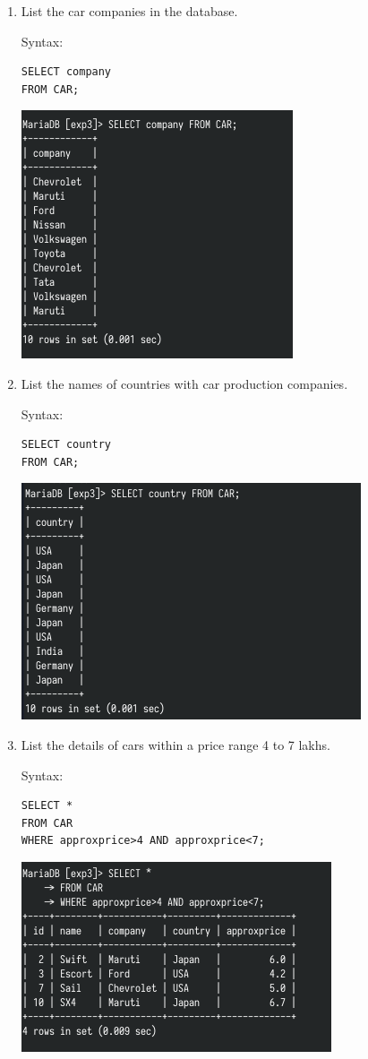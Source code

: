 \documentclass[13pt,oneside]{book}
\begin{document}
\begin{enumerate}
\item
List the car companies in the database.
 
Syntax:
\begin{verbatim}
SELECT company 
FROM CAR;

\end{verbatim}
\includegraphics[]{img/p3/ss2.png}


\item
List the names of countries with car production companies.
 
Syntax:
\begin{verbatim}
SELECT country 
FROM CAR;

\end{verbatim}
\includegraphics[]{img/p3/ss3.png}


\item
List the details of cars within a price range 4 to 7 lakhs.
 
Syntax:
\begin{verbatim}
SELECT *
FROM CAR
WHERE approxprice>4 AND approxprice<7;

\end{verbatim}
\includegraphics[]{img/p3/ss4.png}



\end{enumerate}
\end{document}
